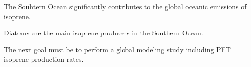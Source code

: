 \documentclass[draft,linenumbers]{agujournal}
\begin{document}





\begin{keypoints}
\item The Souhtern Ocean significantly contributes to the global oceanic emissions of isoprene. 
\item Diatoms are the main isoprene producers in the Southern Ocean. 
\item The next goal must be to perform a global modeling study including PFT isoprene production rates.
\end{keypoints}

%
%

\end{document}
